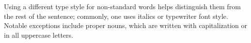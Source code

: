


\noindent Using a different type style for non-standard words helps distinguish them from the rest of the sentence; commonly, one uses italics or typewriter font style.
Notable exceptions include proper nouns, which are written with capitalization or in all uppercase letters.
